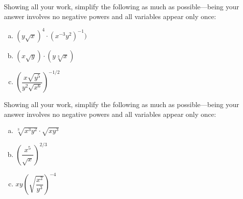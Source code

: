 \documentclass[11pt,letterpaper]{article}
\begin{document}
\newpage



 Showing all your work, simplify the following as much as possible---being your answer involves no negative powers and all variables appear only once:
	\begin{enumerate}[(a)]
	\item $(y \sqrt{x})^4 \cdot (x^{-3} y^2)^{-1})$
	\item $(x \sqrt{y}) \cdot (y \sqrt[3]{x})$
	\item $\left( \dfrac{x \sqrt{y^5}}{y^2 \sqrt{x^6}} \right)^{-1/2}$
	\end{enumerate}



\newpage



 Showing all your work, simplify the following as much as possible---being your answer involves no negative powers and all variables appear only once:
	\begin{enumerate}[(a)]
	\item $\sqrt[3]{x^3 y^2} \cdot \sqrt{x y^3}$
	\item $\left( \dfrac{x^5}{\sqrt{x}} \right)^{2/3}$
	\item $xy \left( \sqrt{\dfrac{x^2}{y^3}} \right)^{-4}$
	\end{enumerate}
\end{document}
